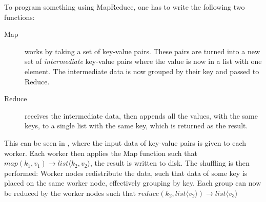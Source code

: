 To program something using MapReduce, one has to write the following two functions: 
\begin{description}
\item[Map] works by taking a set of key-value pairs. These pairs are turned into a new set of \emph{intermediate} key-value pairs where the value is now in a list with one element. The intermediate data is now grouped by their key and passed to Reduce.
\item[Reduce] receives the intermediate data, then appends all the values, with the same keys, to a single list with the same key, which is returned as the result.
\end{description}

This can be seen in , where the input data of key-value pairs is given to each worker. Each worker then applies the Map function such that $map(k_1,v_1)\rightarrow list\langle k_2,v_2\rangle$, the result is written to disk. The shuffling is then performed: Worker nodes redistribute the data, such that data of some key is placed on the same worker node, effectively grouping by key. Each group can now be reduced by the worker nodes such that $reduce(k_2, list\langle v_2\rangle) \rightarrow list\langle v_3 \rangle$ 


